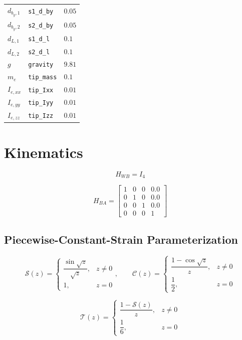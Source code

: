 \documentclass[11pt]{article}
\newcommand{\Sfun}{\mathcal{S}}
\newcommand{\Cfun}{\mathcal{C}}
\newcommand{\Tfun}{\mathcal{T}}
\begin{document}
\begin{longtable}{lll}
$d_{b_y,1}$ & \texttt{s1\_d\_by} & $0.05$ \\
$d_{b_y,2}$ & \texttt{s2\_d\_by} & $0.05$ \\
$d_{L,1}$ & \texttt{s1\_d\_l} & $0.1$ \\
$d_{L,2}$ & \texttt{s2\_d\_l} & $0.1$ \\
$g$ & \texttt{gravity} & $9.81$ \\
$m_e$ & \texttt{tip\_mass} & $0.1$ \\
$I_{e,xx}$ & \texttt{tip\_Ixx} & $0.01$ \\
$I_{e,yy}$ & \texttt{tip\_Iyy} & $0.01$ \\
$I_{e,zz}$ & \texttt{tip\_Izz} & $0.01$ \\
\hline
\end{longtable}

\section{Kinematics}
\begin{equation}
H_{WB}=I_4
\end{equation}

\begin{equation}
H_{BA}=\begin{bmatrix}1 & 0 & 0 & 0.0\\0 & 1 & 0 & 0.0\\0 & 0 & 1 & 0.0\\0 & 0 & 0 & 1\end{bmatrix}\label{eq:mount-transform}
\end{equation}

\subsection{Piecewise-Constant-Strain Parameterization}
\begin{equation}
\Sfun(z)=\begin{cases}\dfrac{\sin\sqrt z}{\sqrt z},&z\ne0\\1,&z=0\end{cases},\qquad \Cfun(z)=\begin{cases}\dfrac{1-\cos\sqrt z}{z},&z\ne0\\\dfrac12,&z=0\end{cases}
\end{equation}

\begin{equation}
\Tfun(z)=\begin{cases}\dfrac{1-\Sfun(z)}{z},&z\ne0\\\dfrac16,&z=0\end{cases}
\end{equation}
\end{document}
